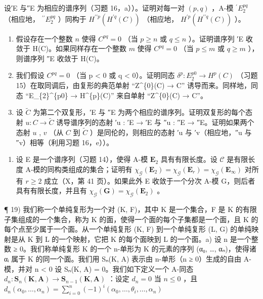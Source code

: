 设′E 与″E 为相应的谱序列（习题 16，a））。证明对每一对 \((p, q)\) ，A-模 \({}^{\prime}E_2^{pq}\) （相应地， \({}^{\prime\prime}E_2^{pq}\) ）同构于 \(H^{\prime\prime p}(H^{\prime q}(C))\) （相应地， \(H^{\prime p}(H^{\prime\prime q}(C))\) ）。

\begin{enumerate}
\def\labelenumi{\alph{enumi})}
\setcounter{enumi}{1}
\item
  假设存在一个整数 \(n\) 使得 \(C^{pq} = 0\) （当 \(p \geqslant n\) 或 \(q \leqslant n\) ）。证明谱序列 ′E 收敛于 H(C)。如果同样存在一个整数 \(m\) 使得 \(C^{pq} = 0\) （当 \(p \leqslant m\) 或 \(q \geqslant m\) ），则谱序列 ″E 收敛于 H(C)。
\item
  我们假设 \(C^{pq} = 0\) （当 p \textless{} 0 或 q \textless{} 0）。证明同态 \(\delta^{p}: E_{2}^{p0} \to H^{p}(C)\) （习题 15）在取同调后，由复形的典范单射 ``Z\^{}\{0\}(C) → C'' 诱导而来。同样地，同态 ``E\_\{2\}\^{}\{p0\} → H\^{}\{p\}(C)'' 来自单射 ``Z\^{}\{0\}(C) → C''。
\item
  设 \(\tilde{C}\) 为第二个双复形，′E 与 ″E 为两个相应的谱序列。证明双复形的每个态射 \(u: C \to \tilde{C}\) 诱导谱序列的态射 ′u : ′E → ′E 与 ″u : ″E → ″E。证明如果两个态射 \(u\) , \(v\) （从 \(C\) 到 \(\tilde{C}\) ）是同伦的，则相应的态射 ′u 与 ′v（相应地，″u 与 ″v）相等（利用习题 16，e））。
\end{enumerate}

\begin{enumerate}
\def\labelenumi{\arabic{enumi})}
\setcounter{enumi}{17}
\tightlist
\item
  设 E 是一个谱序列（习题 14），使得 A-模 \(\mathbf{E}_2\) 具有有限长度。设 \(\mathcal{C}\) 是有限长度 A-模的同构类组成的集合；证明有 \(\chi_{\mathcal{G}}(\mathbf{E}_2) = \chi_{\mathcal{G}}(\mathbf{E}_r) = \chi_{\mathcal{G}}(\mathbf{E}_{\infty})\) 对所有 \(r \geqslant 2\) 成立（X，第 41 页）。如果此外 E 收敛于一个分次 A-模 G，则后者具有有限长度，并且有 \(\chi_{\mathcal{G}}(\mathbf{G}) = \chi_{\mathcal{G}}(\mathbf{E}_2)\) 。
\end{enumerate}

¶ 19) 我们称一个单纯复形为一个对 (K, F)，其中 K 是一个集合，F 是 K 的有限子集组成的一个集合，称为 K 的面，使得一个面的每个子集都是一个面，且 K 的每个点至少属于一个面。从一个单纯复形 (K, F) 到一个单纯复形 (L, G) 的单纯映射是从 K 到 L 的一个映射，它把 K 的每个面映到 L 的一个面。a) 设 n 是一个整数 ≥ 0。我们称单纯复形 K 的一个 n-单形为 K 的元素的序列 (α₀, \ldots, αₙ)，使得诸 αᵢ 属于 K 的同一个面。我们用 Sₙ(K, A) 表示由 n-单形（n ≥ 0）生成的自由 A-模，并对 n \textless{} 0 设 Sₙ(K, A) = 0。我们如下定义一个 A-同态 \(d_{n}:\mathbf{S}_{n}(\mathbf{K},\mathbf{A})\to \mathbf{S}_{n - 1}(\mathbf{K},\mathbf{A})\) ：设定 \(d_{n} = 0\) 当 \(n\leqslant 0\) ，且 \(d_{n}(\alpha_{0},\dots,\alpha_{n}) = \sum_{i = 0}^{n}(-1)^{i}(\alpha_{0},\dots,\theta_{i},\dots,\alpha_{n})\)

